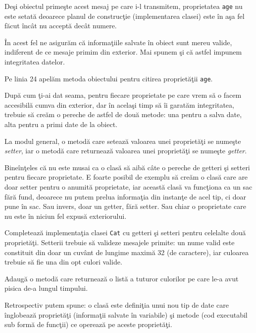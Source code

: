 Deşi obiectul primeşte acest mesaj pe care i-l transmitem, proprietatea
\texttt{age} nu este setată deoarece planul de construcţie (implementarea clasei)
este în aşa fel făcut încât nu acceptă decât numere.

În acest fel ne asigurăm că informaţiile salvate în obiect sunt mereu valide,
indiferent de ce mesaje primim din exterior. Mai spunem şi că astfel
impunem integritatea datelor.

Pe linia 24 apelăm metoda obiectului pentru citirea proprietăţii \texttt{age}.

După cum ţi-ai dat seama, pentru fiecare proprietate pe care vrem să
o facem accesibilă cumva din exterior, dar în acelaşi timp să îi garatăm
integritatea, trebuie să creăm o pereche de astfel de două metode: una
pentru a salva date, alta pentru a primi date de la obiect.

La modul general, o metodă care setează valoarea unei proprietăţi se numeşte
\textsl{setter}, iar o metodă care returnează valoarea unei proprietăţi se
numeşte \textsl{getter}.

Bineînţeles că nu este musai ca o clasă să aibă câte o pereche
de getteri şi setteri pentru fiecare proprietate.
E foarte posibil de exemplu să creăm o clasă care are doar setter pentru
o anumită proprietate, iar această clasă va funcţiona ca un sac
fără fund, deoarece nu putem prelua informaţia din instanţe
de acel tip, ci doar {\glqq}pune în sac{\grqq}. Sau invers, doar
un getter, fără setter. Sau chiar o proprietate care nu este în
niciun fel expusă exteriorului.

\begin{Exercise}[title={A complete Kitty}]
\ExePart
Completează implementaţia clasei \texttt{Cat} cu getteri şi setteri
pentru celelalte două proprietăţi. Setterii trebuie să valideze
mesajele primite: un nume valid este constituit din doar un cuvânt
de lungime maximă 32 (de caractere), iar culoarea trebuie
să fie una din opt culori valide.

\ExePart
Adaugă o metodă care returnează o listă a tuturor culorilor pe
care le-a avut pisica de-a lungul timpului.
\end{Exercise}


Retrospectiv putem spune: o clasă este definiţia unui nou tip de date
care înglobează proprietăţi (informaţii salvate în variabile) şi
metode (cod executabil sub formă de funcţii) ce operează pe aceste
proprietăţi.






% 
% 
% 
